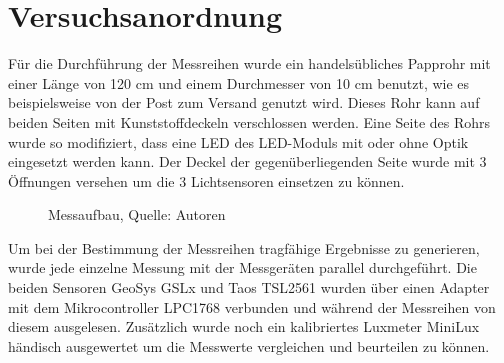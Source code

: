 \documentclass[a4paper,12pt]{scrartcl}
\begin{document}
\clearpage
\section{Versuchsanordnung}
Für die Durchführung der Messreihen wurde ein handelsübliches Papprohr mit
einer Länge von 120 cm und einem Durchmesser von 10 cm benutzt, wie es beispielsweise von der Post zum Versand genutzt wird. Dieses Rohr
kann auf beiden Seiten mit Kunststoffdeckeln verschlossen werden. Eine Seite
des Rohrs wurde so modifiziert, dass eine LED des LED-Moduls mit oder ohne
Optik eingesetzt werden kann. Der Deckel der gegenüberliegenden Seite wurde mit
3 Öffnungen versehen um die 3 Lichtsensoren einsetzen zu können.

\begin{figure}[h] 
  \caption[Messaufbau]{\label{fotohwmessaufbau}Messaufbau, Quelle: Autoren}
\end{figure} 

Um bei der Bestimmung der Messreihen tragfähige Ergebnisse zu generieren, wurde jede einzelne Messung mit der Messgeräten parallel durchgeführt. Die beiden
Sensoren GeoSys GSLx und Taos TSL2561 wurden über einen Adapter mit dem Mikrocontroller LPC1768 verbunden und während der Messreihen von diesem ausgelesen.
Zusätzlich wurde noch ein kalibriertes Luxmeter MiniLux händisch ausgewertet um die Messwerte vergleichen und beurteilen zu können. 
\end{document}
